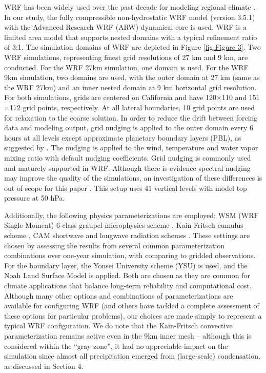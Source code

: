 \documentclass[ms]{agutex}   %
\begin{document}
\begin{article}
WRF has been widely used over the past decade for modeling regional climate \citep{lo2008assessment, leung2009atmospheric, soares2012wrf, sun2015hybrid}. In our study, the fully compressible non-hydrostatic WRF model (version 3.5.1) with the Advanced Research WRF (ARW) dynamical core is used.  WRF is a limited area model that supports nested domains with a typical refinement ratio of 3:1.  The simulation domains of WRF are depicted in Figure \ref{fig:Figure 3}. Two WRF simulations, representing finest grid resolutions of 27 km and 9 km, are conducted.  For the WRF 27km simulation, one domain is used. For the WRF 9km simulation, two domains are used, with the outer domain at 27 km (same as the WRF 27km) and an inner nested domain at 9 km horizontal grid resolution. For both simulations,  grids are centered on California and have 120$\times$110 and 151$\times$172 grid points, respectively. At all lateral boundaries, 10 grid points are used for relaxation to the coarse solution. In order to reduce the drift between forcing data and modeling output, grid nudging \citep{stauffer1990use} is applied to the outer domain every 6 hours at all levels except approximate planetary boundary layers (PBL), as suggested by \cite{lo2008assessment}. The nudging is applied to the wind, temperature and water vapor mixing ratio with default nudging coefficients. Grid nudging is commonly used and maturely supported in WRF. Although there is evidence spectral nudging may improve the quality of the simulations, an investigation of these differences is out of scope for this paper \citep{liu2012differences}. This setup uses 41 vertical levels with model top pressure at 50 hPa.

Additionally, the following physics parameterizations are employed: WSM (WRF Single-Moment) 6-class graupel microphysics scheme \citep{hong2006wrf}, Kain-Fritsch cumulus scheme \citep{kain2004kain}, CAM shortwave and longwave radiation schemes \citep{collins2004description}.  These settings are chosen by assessing the results from several common parameterization combinations over one-year simulation, with comparing to gridded observations. For the boundary layer, the Yonsei University scheme (YSU) \citep{hong2006new} is used, and the Noah Land Surface Model \citep{chen2001coupling} is applied. Both are chosen as they are common for climate applications that balance long-term reliability and computational cost.  Although many other options and combinations of parameterizations are available for configuring WRF (and others have tackled a complete assessment of these options for particular problems), our choices are made simply to represent a typical WRF configuration. We do note that the Kain-Fritsch convective parameterization remains active even in the 9km inner mesh -- although this is considered within the ``gray zone'', it had no appreciable impact on the simulation since almost all precipitation emerged from (large-scale) condensation, as discussed in Section 4.


\end{article}
\end{document}
